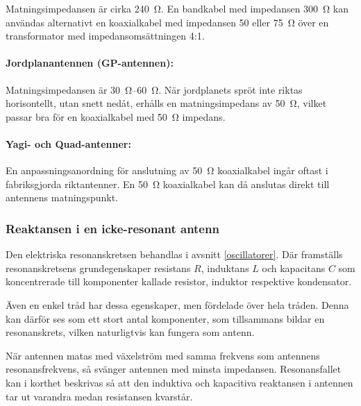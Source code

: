 Matningsimpedansen är cirka \SI{240}{\ohm}.
En bandkabel med impedansen \SI{300}{\ohm} kan användas alternativt en
koaxialkabel med impedansen 50 eller \SI{75}{\ohm} över en transformator med
impedansomsättningen 4:1.

\paragraph{Jordplanantennen (GP-antennen):}

Matningsimpedansen är \SIrange{30}{60}{\ohm}.
När jordplanets spröt inte riktas horisontellt, utan snett nedåt, erhålls en
matningsimpedans av \SI{50}{\ohm}, vilket passar bra för en koaxialkabel med
\SI{50}{\ohm} impedans.

\paragraph{Yagi- och Quad-antenner:}

En anpassningsanordning för anslutning av \SI{50}{\ohm} koaxialkabel ingår
oftast i fabriksgjorda riktantenner.
En \SI{50}{\ohm} koaxialkabel kan då anslutas direkt till antennens
matningspunkt.

\subsubsection{Reaktansen i en icke-resonant antenn}

Den elektriska resonanskretsen behandlas i avsnitt \ref{oscillatorer}.
Där framställs resonanskretsens grundegenskaper resistans \(R\),
induktans \(L\) och kapacitans \(C\) som koncentrerade till komponenter kallade
resistor, induktor respektive kondensator.

Även en enkel tråd har dessa egenskaper, men fördelade över hela tråden.
Denna kan därför ses som ett stort antal komponenter, som tillsammans bildar en
resonanskrets, vilken naturligtvis kan fungera som antenn.

När antennen matas med växelström med samma frekvens som antennens
resonansfrekvens, så svänger antennen med minsta impedansen.
Resonansfallet kan i korthet beskrivas så att den induktiva och kapacitiva
reaktansen i antennen tar ut varandra medan resistansen kvarstår.

